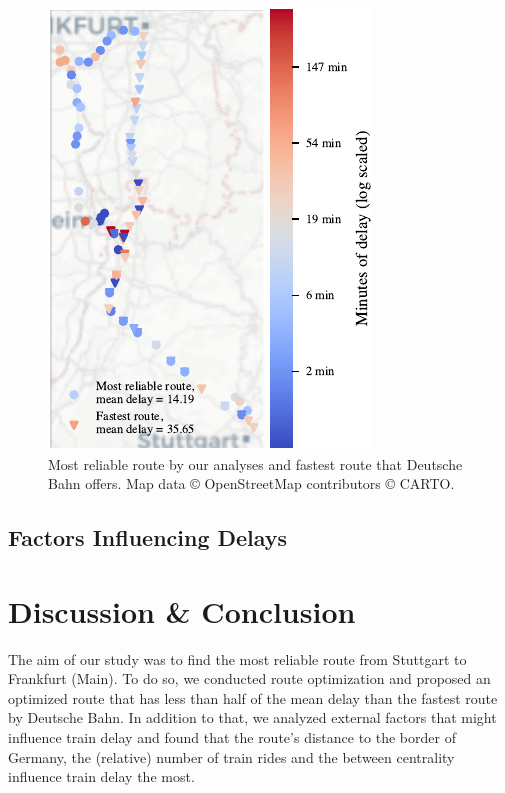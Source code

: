 \documentclass{article}
\theoremstyle{plain}
\theoremstyle{definition}
\theoremstyle{remark}
\begin{document}
\begin{figure} %
\begin{center}
\includegraphics{fig/maps_KI_03_reliable_vs_fastest_zoomed_Carto.pdf} %
\end{center}
\caption{Most reliable route by our analyses and fastest route that Deutsche Bahn offers. Map data © OpenStreetMap contributors © CARTO.}
\end{figure}

\subsection{Factors Influencing Delays}\label{sec:results_ext}

\section{Discussion \& Conclusion}\label{sec:conclusion}

The aim of our study was to find the most reliable route from Stuttgart to Frankfurt (Main). To do so, we conducted route optimization and proposed an optimized route that has less than half of the mean delay than the fastest route by Deutsche Bahn. In addition to that, we analyzed external factors that might influence train delay and found that the route's distance to the border of Germany, the (relative) number of train rides and the between centrality influence train delay the most.
\end{document}
